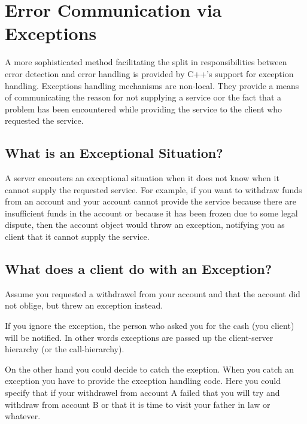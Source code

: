 \section{Error Communication via Exceptions}


A more sophisticated method facilitating the split in responsibilities between error
detection and error handling is provided by C++'s support for exception handling.
Exceptions handling mechanisms are non-local. They provide a means of
communicating the reason for not supplying a service oor the fact that a problem
has been encountered while providing the service to the client who requested
the service.


\subsection{What is an Exceptional Situation?}

A server encouters an exceptional situation when it does not know when it cannot
supply the requested service. For example, if you want to withdraw funds from an
account and your account cannot provide the service because there are
insufficient funds in the account or because it has been frozen due to some
legal dispute, then the account object would throw an exception, notifying
you as client that it cannot supply the service.


\subsection{What does a client do with an Exception?}

Assume you requested a withdrawel from your account and that the account
did not oblige, but threw an exception instead.

If you ignore the exception, the person who asked you for the cash (you client)
will be notified. In other words exceptions are passed up the client-server
hierarchy (or the call-hierarchy). 

On the other hand you could decide to catch the exeption. When you catch an 
exception you have to provide the exception handling code. Here you could 
specify that if your withdrawel from account A failed that you will try and 
withdraw from account B or that it is time to visit your father in law or 
whatever.

